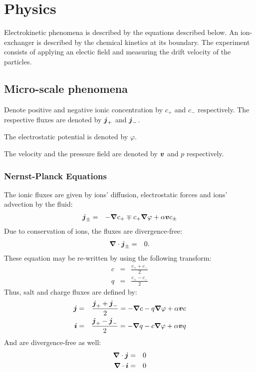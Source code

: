 \section{Physics}
Electrokinetic phenomena is described by the equations described below.
An ion-exchanger is described by the chemical kinetics at its boundary.
The experiment consists of applying an electic field and measuring the drift velocity of the particles.

\subsection{Micro-scale phenomena}
Denote positive and negative ionic concentration by $c_+$ and $c_-$ respectively.
The respective fluxes are denoted by $\boldsymbol{j}_+$ and $\boldsymbol{j}_-$.

The electrostatic potential is denoted by $\varphi$. 

The velocity and the pressure field are denoted by $\boldsymbol{v}$ and $p$ respectively.

\subsubsection{Nernst-Planck Equations}
The ionic fluxes are given by ions' diffusion, electrostatic forces and ions' advection by the fluid:
\begin{eqnarray}
 \nonumber \boldsymbol{j}_\pm &=& -\boldsymbol{\nabla} c_+ \mp c_+ \boldsymbol{\nabla} \varphi + \alpha \boldsymbol{v} c_\pm
\end{eqnarray}
Due to conservation of ions, the fluxes are divergence-free:
\begin{eqnarray}
\boldsymbol{\nabla} \cdot \boldsymbol{j}_\pm &=& 0.
\end{eqnarray}
These equation may be re-written by using the following transform:
\begin{eqnarray}
 \nonumber c &=& \frac{c_+ + c_-}{2}\\
 \nonumber q &=& \frac{c_+ - c_-}{2}
\end{eqnarray}
Thus, salt and charge fluxes are defined by:
\begin{eqnarray}
 \nonumber \boldsymbol{j} &=& \frac{\boldsymbol{j}_+ + \boldsymbol{j}_-}{2} = -\boldsymbol{\nabla} c - q \boldsymbol{\nabla} \varphi + \alpha \boldsymbol{v} c \\
 \nonumber \boldsymbol{i} &=& \frac{\boldsymbol{j}_+ - \boldsymbol{j}_-}{2} = -\boldsymbol{\nabla} q - c \boldsymbol{\nabla} \varphi + \alpha \boldsymbol{v} q
\end{eqnarray}
And are divergence-free as well:
\begin{eqnarray}
\boldsymbol{\nabla} \cdot \boldsymbol{j} &=& 0 \\
\boldsymbol{\nabla} \cdot \boldsymbol{i} &=& 0 
\end{eqnarray}

